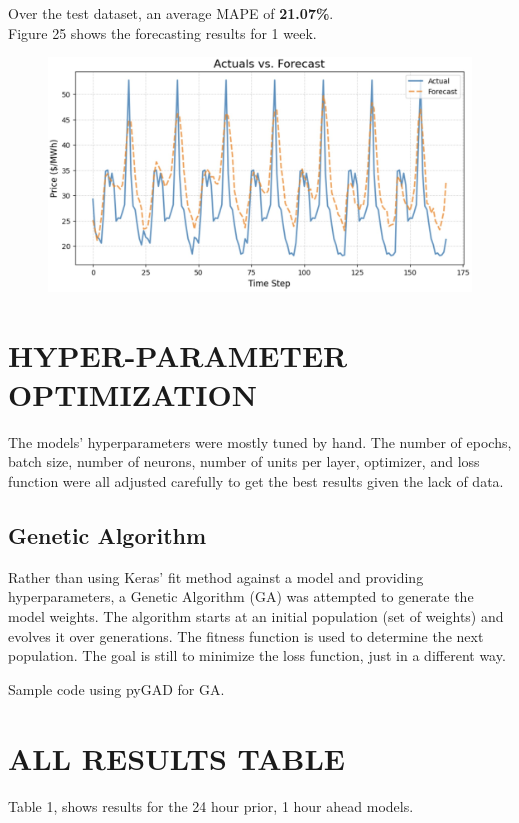 \documentclass[9pt,a4paper,twoside]{rho}
\begin{document}
\noindent Over the test dataset, an average MAPE of \textbf{21.07\%}.\\

\noindent Figure 25 shows the forecasting results for 1 week.
\begin{figure}[H]
	\centering
	\includegraphics[width=0.8\columnwidth]{Figures/CNN-LSTM_24_24_Results.png}
\end{figure}

\section*{HYPER-PARAMETER OPTIMIZATION}

The models' hyperparameters were mostly tuned by hand. The number of epochs, batch size, number of neurons, number of units per layer, optimizer, and loss function were all adjusted carefully to get the best results given the lack of data. 

\subsection*{Genetic Algorithm}
Rather than using Keras' fit method against a model and providing hyperparameters, a Genetic Algorithm (GA) was attempted to generate the model weights. The algorithm starts at an initial population (set of weights) and evolves it over generations. The fitness function is used to determine the next population. The goal is still to minimize the loss function, just in a different way.

\noindent Sample code using pyGAD for GA.


\section*{ALL RESULTS TABLE}

Table 1, shows results for the 24 hour prior, 1 hour ahead models. 
\end{document}
